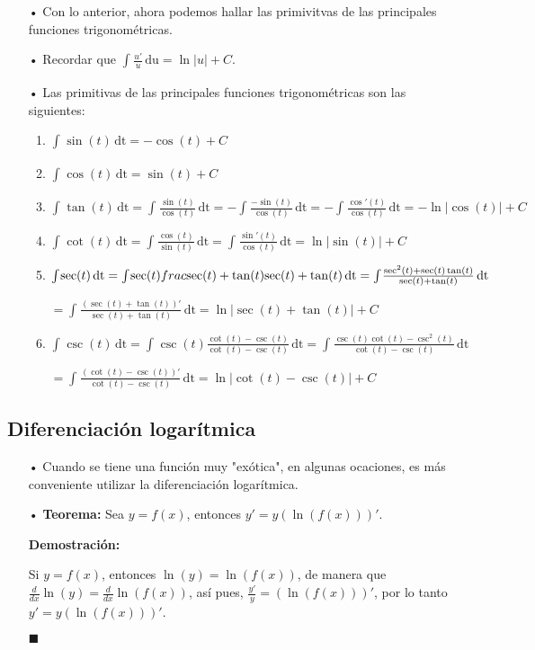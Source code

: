 \documentclass[pts12]{article}
\numberwithin{equation}{section}
\newcommand{\Col}{\color{ProcessBlue}}
\newcommand{\xinteg}[4]{\int_{#1}^{#2} \! {#3} \, \mathrm{#4}}
\begin{document}
\begin{itemize}
\item[\Col •] Con lo anterior, ahora podemos hallar las primivitvas de las principales funciones trigonométricas. 

\item[\Col •] Recordar que $\xinteg{}{}{\frac{u'}{u}}{du}=\ln|u|+C$.

\item[\Col •] Las primitivas de las principales funciones trigonométricas son las siguientes:

\begin{enumerate}
\item $\xinteg{}{}{\sin(t)}{dt}=-\cos(t)+C$
\item $\xinteg{}{}{\cos(t)}{dt}=\sin(t)+C$
\item $\xinteg{}{}{\tan(t)}{dt}=\xinteg{}{}{\frac{\sin(t)}{\cos(t)}}{dt}=-\xinteg{}{}{\frac{-\sin(t)}{\cos(t)}}{dt}=-\xinteg{}{}{\frac{\cos'(t)}{\cos(t)}}{dt}=-\ln|\cos(t)|+C$
\item $\xinteg{}{}{\cot(t)}{dt}=\xinteg{}{}{\frac{\cos(t)}{\sin(t)}}{dt}=\xinteg{}{}{\frac{\sin'(t)}{\cos(t)}}{dt}=\ln|\sin(t)|+C$
\item $\xinteg{}{}{\sec(t)}{dt}=\xinteg{}{}{\sec(t)\\frac{\sec(t)+\tan(t)}{\sec(t)+\tan(t)}}{dt}=\xinteg{}{}{\frac{\sec^2(t)+\sec(t)\tan(t)}{\sec(t)+\tan(t)}}{dt}$

$=\xinteg{}{}{\frac{(\sec(t)+\tan(t))'}{\sec(t)+\tan(t)}}{dt}=\ln|\sec(t)+\tan(t)|+C$
\item $\xinteg{}{}{\csc(t)}{dt}=\xinteg{}{}{\csc(t)\frac{\cot(t)-\csc(t)}{\cot(t)-\csc(t)}}{dt}=\xinteg{}{}{\frac{\csc(t)\cot(t)-\csc^2(t)}{\cot(t)-\csc(t)}}{dt}$

$=\xinteg{}{}{\frac{(\cot(t)-\csc(t))'}{\cot(t)-\csc(t)}}{dt}=\ln|\cot(t)-\csc(t)|+C$
\end{enumerate}

\end{itemize}

\subsection{\Col Diferenciación logarítmica}

\begin{itemize}
\item[\Col •] Cuando se tiene una función muy "exótica", en algunas ocaciones, es más conveniente utilizar la diferenciación logarítmica.

\item[\Col •] \textbf{Teorema:} Sea $y=f(x)$, entonces $y'=y(\ln(f(x)))'$.

\textbf{Demostración:}

Si $y=f(x)$, entonces $\ln(y)=\ln(f(x))$, de manera que $\frac{d}{dx}\ln(y)=\frac{d}{dx}\ln(f(x))$, así pues, $\frac{y'}{y}=(\ln(f(x)))'$, por lo tanto $y'=y(\ln(f(x)))'$.  

\begin{flushright}
$\blacksquare$
\end{flushright}  

\end{itemize}
\end{document}
